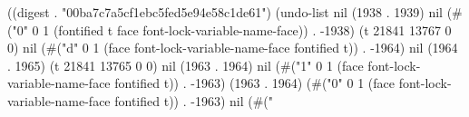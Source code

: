 
((digest . "00ba7c7a5cf1ebc5fed5e94e58c1de61") (undo-list nil (1938 . 1939) nil (#("0" 0 1 (fontified t face font-lock-variable-name-face)) . -1938) (t 21841 13767 0 0) nil (#("d" 0 1 (face font-lock-variable-name-face fontified t)) . -1964) nil (1964 . 1965) (t 21841 13765 0 0) nil (1963 . 1964) nil (#("1" 0 1 (face font-lock-variable-name-face fontified t)) . -1963) (1963 . 1964) (#("0" 0 1 (face font-lock-variable-name-face fontified t)) . -1963) nil (#("%